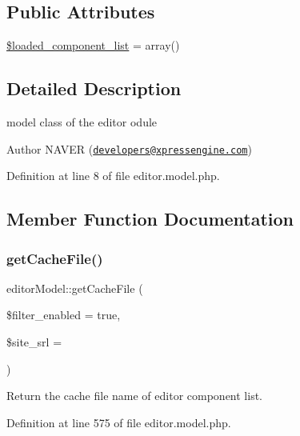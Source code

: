 \subsection*{Public Attributes}
\begin{DoxyCompactItemize}
\item 
\hyperlink{classeditorModel_ad909303f399467f4bd587e8369eb40a1}{\$loaded\+\_\+component\+\_\+list} = array()
\end{DoxyCompactItemize}


\subsection{Detailed Description}
model class of the editor odule 

\begin{DoxyAuthor}{Author}
N\+A\+V\+ER (\href{mailto:developers@xpressengine.com}{\tt developers@xpressengine.\+com}) 
\end{DoxyAuthor}


Definition at line 8 of file editor.\+model.\+php.



\subsection{Member Function Documentation}
\mbox{\label{classeditorModel_ab125348dd5be10fdafe6e38922254d5e}} 
\subsubsection{\texorpdfstring{get\+Cache\+File()}{getCacheFile()}}
{\footnotesize\ttfamily editor\+Model\+::get\+Cache\+File (\begin{DoxyParamCaption}\item[{}]{\$filter\+\_\+enabled = {\ttfamily true},  }\item[{}]{\$site\+\_\+srl = {} }\end{DoxyParamCaption})}



Return the cache file name of editor component list. 



Definition at line 575 of file editor.\+model.\+php.

\mbox{\label{classeditorModel_a6330fcddc7363899989bfe4128010236}} 
